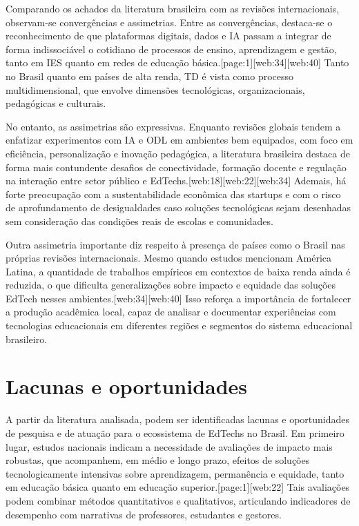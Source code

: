 \documentclass[12pt]{article}
\begin{document}
Comparando os achados da literatura brasileira com as revis\~oes internacionais, observam-se converg\^encias e assimetrias. Entre as converg\^encias, destaca-se o reconhecimento de que plataformas digitais, dados e IA passam a integrar de forma indissoci\'avel o cotidiano de processos de ensino, aprendizagem e gest\~ao, tanto em IES quanto em redes de educa\c{c}\~ao b\'asica.[page:1][web:34][web:40] Tanto no Brasil quanto em pa\'ises de alta renda, TD \'e vista como processo multidimensional, que envolve dimens\~oes tecnol\'ogicas, organizacionais, pedag\'ogicas e culturais.

No entanto, as assimetrias s\~ao expressivas. Enquanto revis\~oes globais tendem a enfatizar experimentos com IA e ODL em ambientes bem equipados, com foco em efici\^encia, personaliza\c{c}\~ao e inova\c{c}\~ao pedag\'ogica, a literatura brasileira destaca de forma mais contundente desafios de conectividade, forma\c{c}\~ao docente e regula\c{c}\~ao na intera\c{c}\~ao entre setor p\'ublico e EdTechs.[web:18][web:22][web:34] Ademais, h\'a forte preocupa\c{c}\~ao com a sustentabilidade econ\^omica das startups e com o risco de aprofundamento de desigualdades caso solu\c{c}\~oes tecnol\'ogicas sejam desenhadas sem considera\c{c}\~ao das condi\c{c}\~oes reais de escolas e comunidades.

Outra assimetria importante diz respeito \`a presen\c{c}a de pa\'ises como o Brasil nas pr\'oprias revis\~oes internacionais. Mesmo quando estudos mencionam Am\'erica Latina, a quantidade de trabalhos emp\'iricos em contextos de baixa renda ainda \'e reduzida, o que dificulta generaliza\c{c}\~oes sobre impacto e equidade das solu\c{c}\~oes EdTech nesses ambientes.[web:34][web:40] Isso refor\c{c}a a import\^ancia de fortalecer a produ\c{c}\~ao acad\^emica local, capaz de analisar e documentar experi\^encias com tecnologias educacionais em diferentes regi\~oes e segmentos do sistema educacional brasileiro.

\section{Lacunas e oportunidades}

A partir da literatura analisada, podem ser identificadas lacunas e oportunidades de pesquisa e de atua\c{c}\~ao para o ecossistema de EdTechs no Brasil. Em primeiro lugar, estudos nacionais indicam a necessidade de avalia\c{c}\~oes de impacto mais robustas, que acompanhem, em m\'edio e longo prazo, efeitos de solu\c{c}\~oes tecnologicamente intensivas sobre aprendizagem, perman\^encia e equidade, tanto em educa\c{c}\~ao b\'asica quanto em educa\c{c}\~ao superior.[page:1][web:22] Tais avalia\c{c}\~oes podem combinar m\'etodos quantitativos e qualitativos, articulando indicadores de desempenho com narrativas de professores, estudantes e gestores.
\end{document}
